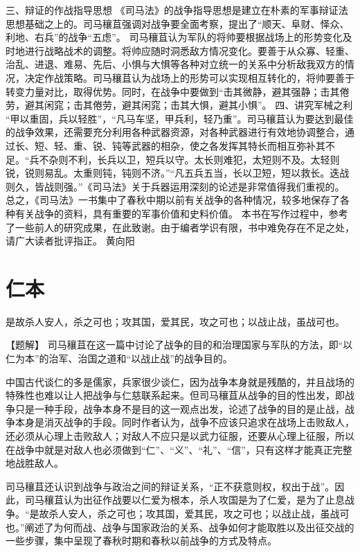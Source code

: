 \documentclass[a4paper,12pt,UTF8,twoside]{ctexbook}
\begin{document}
三、辩证的作战指导思想
《司马法》的战争指导思想是建立在朴素的军事辩证法思想基础之上的。司马穰苴强调对战争要全面考察，提出了“顺天、阜财、怿众、利地、右兵”的战争“五虑”。
司马穰苴认为军队的将帅要根据战场上的形势变化及时地进行战略战术的调整。将帅应随时洞悉敌方情况变化。要善于从众寡、轻重、治乱、进退、难易、先后、小惧与大惧等各种对立统一的关系中分析敌我双方的情况，决定作战策略。司马穰苴认为战场上的形势可以实现相互转化的，将帅要善于转变力量对比，取得优势。同时，在战争中要做到“击其微静，避其强静；击其倦劳，避其闲窕；击其倦劳，避其闲窕；击其大惧，避其小惧”。
四、讲究军械之利
“甲以重固，兵以轻胜”，“凡马车坚，甲兵利，轻乃重”。司马穰苴认为要达到最佳的战争效果，还需要充分利用各种武器资源，对各种武器进行有效地协调整合，通过长、短、轻、重、锐、钝等武器的相杂，使之各发挥其特长而相互弥补其不足。“兵不杂则不利，长兵以卫，短兵以守。太长则难犯，太短则不及。太轻则锐，锐则易乱。太重则钝，钝则不济。”“凡五兵五当，长以卫短，短以救长。迭战则久，皆战则强。”《司马法》关于兵器运用深刻的论述是非常值得我们重视的。
总之，《司马法》一书集中了春秋中期以前有关战争的各种情况，较多地保存了各种有关战争的资料，具有重要的军事价值和史料价值。
本书在写作过程中，参考了一些前人的研究成果，在此致谢。由于编者学识有限，书中难免存在不足之处，请广大读者批评指正。
黄向阳

\mainmatter

\chapter{仁本}

是故杀人安人，杀之可也；攻其国，爱其民，攻之可也；以战止战，虽战可也。

【题解】
司马穰苴在这一篇中讨论了战争的目的和治理国家与军队的方法，即“以仁为本”的治军、治国之道和“以战止战”的战争目的。

中国古代谈仁的多是儒家，兵家很少谈仁，因为战争本身就是残酷的，并且战场的特殊性也难以让人把战争与仁慈联系起来。但司马穰苴从战争的目的性出发，即战争只是一种手段，战争本身不是目的这一观点出发，论述了战争的目的是止战，战争本身是消灭战争的手段。同时作者认为，战争不应该只追求在战场上击败敌人，还必须从心理上击败敌人；对敌人不应只是以武力征服，还要从心理上征服，所以在战争中就是对敌人也必须做到“仁”、“义”、“礼”、“信”，只有这样才能真正完整地战胜敌人。

司马穰苴还认识到战争与政治之间的辩证关系，“正不获意则权，权出于战”。因此，司马穰苴认为出征作战要以仁爱为根本，杀人攻国是为了仁爱，是为了止息战争。“是故杀人安人，杀之可也；攻其国，爱其民，攻之可也；以战止战，虽战可也。”阐述了为何而战、战争与国家政治的关系、战争如何才能取胜以及出征交战的一些步骤，集中呈现了春秋时期和春秋以前战争的方式及特点。
\end{document}
